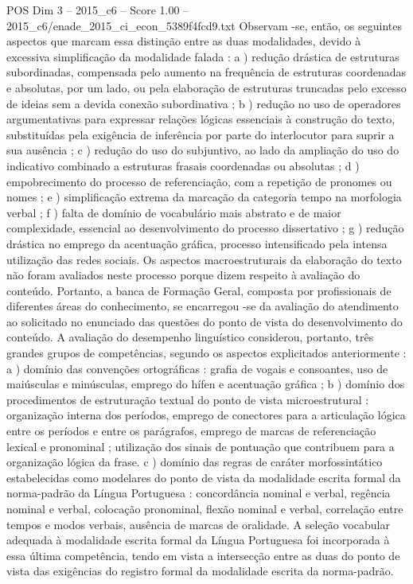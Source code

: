 \begin{textsample}{POS Dim 3 – 2015\_c6 – Score 1.00 – 2015\_c6/enade\_2015\_ci\_econ\_5389f4fcd9.txt}
Observam -se, então, os seguintes aspectos que marcam essa distinção entre as duas modalidades, devido à excessiva simplificação da modalidade falada : a ) redução drástica de estruturas subordinadas, compensada pelo aumento na frequência de estruturas coordenadas e absolutas, por um lado, ou pela elaboração de estruturas truncadas pelo excesso de ideias sem a devida conexão subordinativa ; b ) redução no uso de operadores argumentativas para expressar relações lógicas essenciais à construção do texto, substituídas pela exigência de inferência por parte do interlocutor para suprir a sua ausência ; c ) redução do uso do subjuntivo, ao lado da ampliação do uso do indicativo combinado a estruturas frasais coordenadas ou absolutas ; d ) empobrecimento do processo de referenciação, com a repetição de pronomes ou nomes ; e ) simplificação extrema da marcação da categoria tempo na morfologia verbal ; f ) falta de domínio de vocabulário mais abstrato e de maior complexidade, essencial ao desenvolvimento do processo dissertativo ; g ) redução drástica no emprego da acentuação gráfica, processo intensificado pela intensa utilização das redes sociais.
Os aspectos macroestruturais da elaboração do texto não foram avaliados neste processo porque dizem respeito à avaliação do conteúdo.
Portanto, a banca de Formação Geral, composta por profissionais de diferentes áreas do conhecimento, se encarregou -se da avaliação do atendimento ao solicitado no enunciado das questões do ponto de vista do desenvolvimento do conteúdo.
A avaliação do desempenho linguístico considerou, portanto, três grandes grupos de competências, segundo os aspectos explicitados anteriormente : a ) domínio das convenções ortográficas : grafia de vogais e consoantes, uso de maiúsculas e minúsculas, emprego do hífen e acentuação gráfica ; b ) domínio dos procedimentos de estruturação textual do ponto de vista microestrutural : organização interna dos períodos, emprego de conectores para a articulação lógica entre os períodos e entre os parágrafos, emprego de marcas de referenciação lexical e pronominal ; utilização dos sinais de pontuação que contribuem para a organização lógica da frase. c ) domínio das regras de caráter morfossintático estabelecidas como modelares do ponto de vista da modalidade escrita formal da norma-padrão da Língua Portuguesa : concordância nominal e verbal, regência nominal e verbal, colocação pronominal, flexão nominal e verbal, correlação entre tempos e modos verbais, ausência de marcas de oralidade.
A seleção vocabular adequada à modalidade escrita formal da Língua Portuguesa foi incorporada à essa última competência, tendo em vista a intersecção entre as duas do ponto de vista das exigências do registro formal da modalidade escrita da norma-padrão.

\end{textsample}
